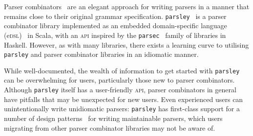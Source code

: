 \documentclass[../../main.tex]{subfiles}
\begin{document}

Parser combinators~\cite{hutton_higher-order_1992} are an elegant approach for writing parsers in a manner that remains close to their original grammar specification.
\texttt{parsley}~\cite{willis_garnishing_2018} is a parser combinator library implemented as an embedded domain-specific language (e\textsc{dsl})~\cite{hudak_building_1996} in Scala, with an \textsc{api} inspired by the \texttt{parsec}~\cite{leijen_parsec_2001} family of libraries in Haskell.
However, as with many libraries, there exists a learning curve to utilising \texttt{parsley} and parser combinator libraries in an idiomatic manner.

While well-documented, the wealth of information to get started with \texttt{parsley} can be overwhelming for users, particularly those new to parser combinators.
Although \texttt{parsley} itself has a user-friendly \textsc{api}, parser combinators in general have pitfalls that may be unexpected for new users.
Even experienced users can unintentionally write unidiomatic parsers: \texttt{parsley} has first-class support for a number of design patterns~\cite{willis_design_2022} for writing maintainable parsers, which users migrating from other parser combinator libraries may not be aware of.
\end{document}
